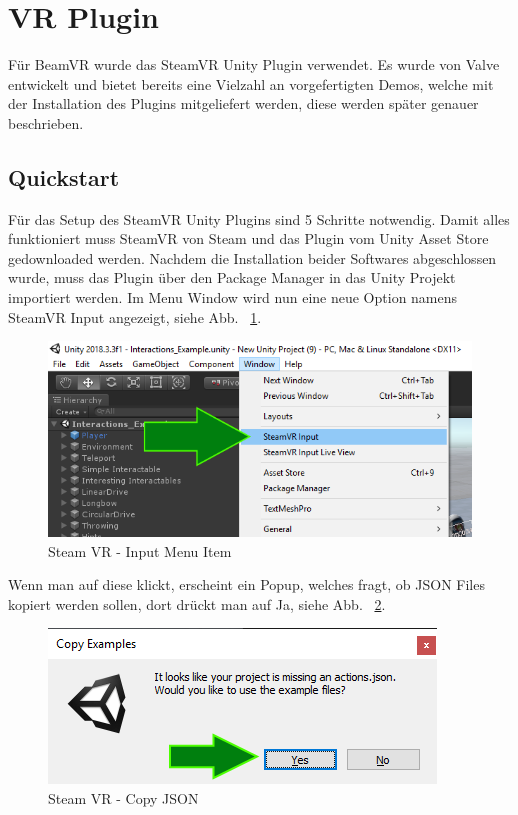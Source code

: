 \section{VR Plugin}\label{sec:vr-plugin}
Für BeamVR wurde das SteamVR Unity Plugin verwendet.
Es wurde von Valve entwickelt und bietet bereits eine Vielzahl an vorgefertigten Demos, welche mit der Installation des Plugins mitgeliefert werden, diese werden später genauer beschrieben.
~\cite{SteamVR_Overview_2022}

\subsection{Quickstart}\label{subsec:quickstart}
Für das Setup des SteamVR Unity Plugins sind 5 Schritte notwendig.
Damit alles funktioniert muss SteamVR von Steam und das Plugin vom Unity Asset Store gedownloaded werden.
Nachdem die Installation beider Softwares abgeschlossen wurde, muss das Plugin über den Package Manager in das Unity Projekt importiert werden.
Im Menu Window wird nun eine neue Option namens SteamVR Input angezeigt, siehe Abb. ~\ref{fig:steamvr_input_menu_item}.
\begin {figure}
    \centering
    \includegraphics[scale=0.9]{pics/steamVR_Input_MenuItem}
    \caption{Steam VR - Input Menu Item}
    \label{fig:steamvr_input_menu_item}
\end {figure}
Wenn man auf diese klickt, erscheint ein Popup, welches fragt, ob JSON Files kopiert werden sollen, dort drückt man auf Ja, siehe Abb. ~\ref{fig:steamvr_copy_json}.
\begin {figure}
    \centering
    \includegraphics[scale=1]{pics/steamVR_Input_CopyJSON}
    \caption{Steam VR - Copy JSON}
    \label{fig:steamvr_copy_json}
\end {figure}

